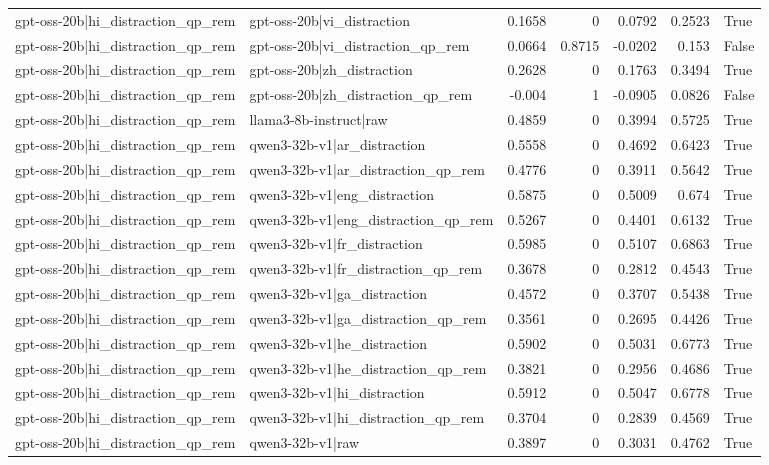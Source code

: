 \begin{table}
\begin{tabular}{l l r r r r l}
gpt-oss-20b|hi_distraction_qp_rem & gpt-oss-20b|vi_distraction & 0.1658 & 0 & 0.0792 & 0.2523 & True \\
gpt-oss-20b|hi_distraction_qp_rem & gpt-oss-20b|vi_distraction_qp_rem & 0.0664 & 0.8715 & -0.0202 & 0.153 & False \\
gpt-oss-20b|hi_distraction_qp_rem & gpt-oss-20b|zh_distraction & 0.2628 & 0 & 0.1763 & 0.3494 & True \\
gpt-oss-20b|hi_distraction_qp_rem & gpt-oss-20b|zh_distraction_qp_rem & -0.004 & 1 & -0.0905 & 0.0826 & False \\
gpt-oss-20b|hi_distraction_qp_rem & llama3-8b-instruct|raw & 0.4859 & 0 & 0.3994 & 0.5725 & True \\
gpt-oss-20b|hi_distraction_qp_rem & qwen3-32b-v1|ar_distraction & 0.5558 & 0 & 0.4692 & 0.6423 & True \\
gpt-oss-20b|hi_distraction_qp_rem & qwen3-32b-v1|ar_distraction_qp_rem & 0.4776 & 0 & 0.3911 & 0.5642 & True \\
gpt-oss-20b|hi_distraction_qp_rem & qwen3-32b-v1|eng_distraction & 0.5875 & 0 & 0.5009 & 0.674 & True \\
gpt-oss-20b|hi_distraction_qp_rem & qwen3-32b-v1|eng_distraction_qp_rem & 0.5267 & 0 & 0.4401 & 0.6132 & True \\
gpt-oss-20b|hi_distraction_qp_rem & qwen3-32b-v1|fr_distraction & 0.5985 & 0 & 0.5107 & 0.6863 & True \\
gpt-oss-20b|hi_distraction_qp_rem & qwen3-32b-v1|fr_distraction_qp_rem & 0.3678 & 0 & 0.2812 & 0.4543 & True \\
gpt-oss-20b|hi_distraction_qp_rem & qwen3-32b-v1|ga_distraction & 0.4572 & 0 & 0.3707 & 0.5438 & True \\
gpt-oss-20b|hi_distraction_qp_rem & qwen3-32b-v1|ga_distraction_qp_rem & 0.3561 & 0 & 0.2695 & 0.4426 & True \\
gpt-oss-20b|hi_distraction_qp_rem & qwen3-32b-v1|he_distraction & 0.5902 & 0 & 0.5031 & 0.6773 & True \\
gpt-oss-20b|hi_distraction_qp_rem & qwen3-32b-v1|he_distraction_qp_rem & 0.3821 & 0 & 0.2956 & 0.4686 & True \\
gpt-oss-20b|hi_distraction_qp_rem & qwen3-32b-v1|hi_distraction & 0.5912 & 0 & 0.5047 & 0.6778 & True \\
gpt-oss-20b|hi_distraction_qp_rem & qwen3-32b-v1|hi_distraction_qp_rem & 0.3704 & 0 & 0.2839 & 0.4569 & True \\
gpt-oss-20b|hi_distraction_qp_rem & qwen3-32b-v1|raw & 0.3897 & 0 & 0.3031 & 0.4762 & True \\

\end{tabular}
\end{table}
